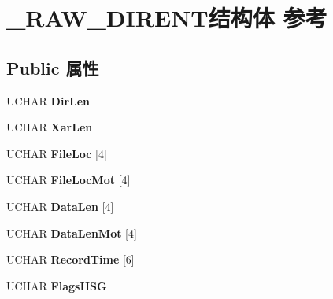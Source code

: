 \hypertarget{struct___r_a_w___d_i_r_e_n_t}{}\section{\+\_\+\+R\+A\+W\+\_\+\+D\+I\+R\+E\+N\+T结构体 参考}
\label{struct___r_a_w___d_i_r_e_n_t}
\subsection*{Public 属性}
\begin{DoxyCompactItemize}
\item 
\mbox{\label{struct___r_a_w___d_i_r_e_n_t_ab4f95ca471795441f6943e9c9dc80dfe}} 
U\+C\+H\+AR {\bfseries Dir\+Len}
\item 
\mbox{\label{struct___r_a_w___d_i_r_e_n_t_a90e10cf782557df657966b62095dafdf}} 
U\+C\+H\+AR {\bfseries Xar\+Len}
\item 
\mbox{\label{struct___r_a_w___d_i_r_e_n_t_a28bf1c8cd7dfc75f6661ddf718a1c4ea}} 
U\+C\+H\+AR {\bfseries File\+Loc} \mbox{[}4\mbox{]}
\item 
\mbox{\label{struct___r_a_w___d_i_r_e_n_t_abd63e79c5db1087fed6aa2b52b7eaff1}} 
U\+C\+H\+AR {\bfseries File\+Loc\+Mot} \mbox{[}4\mbox{]}
\item 
\mbox{\label{struct___r_a_w___d_i_r_e_n_t_aec978451b901b2e94841f62809a1910b}} 
U\+C\+H\+AR {\bfseries Data\+Len} \mbox{[}4\mbox{]}
\item 
\mbox{\label{struct___r_a_w___d_i_r_e_n_t_a00c1394c076b7c8c1904bd6c73b3abb7}} 
U\+C\+H\+AR {\bfseries Data\+Len\+Mot} \mbox{[}4\mbox{]}
\item 
\mbox{\label{struct___r_a_w___d_i_r_e_n_t_a6cfbf87abd9874a7e053a3ffbb3a5774}} 
U\+C\+H\+AR {\bfseries Record\+Time} \mbox{[}6\mbox{]}
\item 
\mbox{\label{struct___r_a_w___d_i_r_e_n_t_a59b6d7f48a0ce9c5bda21c27d4c95b06}} 
U\+C\+H\+AR {\bfseries Flags\+H\+SG}

\end{DoxyCompactItemize}
